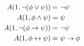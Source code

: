 $\begin{aligned}
  A(1, \lnot (\phi \lor \psi)) =&\ \lnot \psi\\
  A(1, \phi \land \psi) =&\  \psi\\
  A(1, \lnot (\phi \to \psi)) =&\  \lnot \psi\\
  A(1, \phi \leftrightarrow \psi) =&\  \psi \to \phi
\end{aligned}$